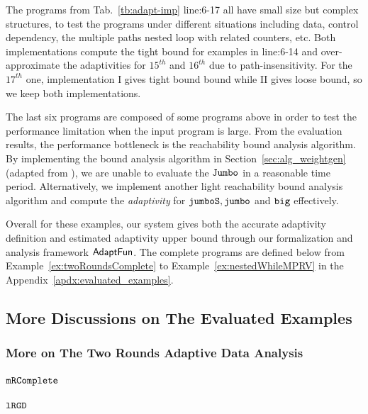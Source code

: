 The programs from Tab.~\ref{tb:adapt-imp} line:6-17 all have small size but complex structures, to test the programs under different situations including
data, control dependency,
the multiple paths nested loop with related counters, etc.
Both implementations compute the tight bound for examples in line:6-14
and over-approximate the adaptivities for $15^{th}$ and $16^{th}$ due to path-insensitivity.
For the $17^{th}$ one, implementation I gives tight bound bound while II gives loose bound, so we keep both implementations.

The last six programs are composed of some programs above in order to test the performance limitation when the input program is large. 
From the evaluation results, the performance bottleneck is the reachability bound analysis algorithm.
By implementing the bound analysis algorithm in Section~\ref{sec:alg_weightgen} (adapted from \cite{sinn2017complexity}), we are unable to evaluate the $\mathtt{Jumbo}$ in a reasonable time period.
Alternatively, we implement another light reachability bound analysis algorithm and compute the \emph{adaptivity} for
$\mathtt{jumboS}, \mathtt{jumbo}$ and $\mathtt{big}$ effectively.

Overall for these examples, our system gives both the accurate adaptivity definition and estimated
adaptivity upper bound through our formalization and analysis framework $\textsf{AdaptFun}$.
The complete programs are defined below from Example~\ref{ex:twoRoundsComplete} to Example~\ref{ex:nestedWhileMPRV} in the Appendix~\ref{apdx:evaluated_examples}.



 \subsection{More Discussions on The Evaluated Examples}  
 \subsubsection{More on The Two Rounds Adaptive Data Analysis} 
 
 \subsubsection{$\mathtt{mRComplete}$} 
 
\subsubsection{$\mathtt{lRGD}$}

% 

% 
